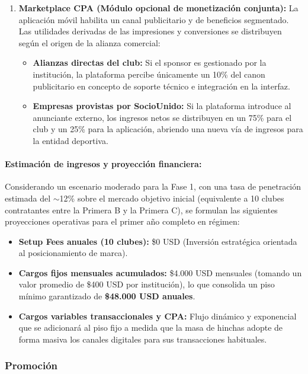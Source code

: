 \begin{enumerate}
\begin{itemize}
    \end{itemize}
    \newpage
    \item \textbf{Marketplace CPA (Módulo opcional de monetización conjunta):} La aplicación móvil habilita un canal publicitario y de beneficios segmentado. Las utilidades derivadas de las impresiones y conversiones se distribuyen según el origen de la alianza comercial:
    \begin{itemize}
        \item \textbf{Alianzas directas del club:} Si el sponsor es gestionado por la institución, la plataforma percibe únicamente un 10\% del canon publicitario en concepto de soporte técnico e integración en la interfaz.
        \item \textbf{Empresas provistas por SocioUnido:} Si la plataforma introduce al anunciante externo, los ingresos netos se distribuyen en un 75\% para el club y un 25\% para la aplicación, abriendo una nueva vía de ingresos para la entidad deportiva.
    \end{itemize}
\end{enumerate}

\paragraph{Estimación de ingresos y proyección financiera:}

Considerando un escenario moderado para la Fase 1, con una tasa de penetración estimada del $\sim$12\% sobre el mercado objetivo inicial (equivalente a 10 clubes contratantes entre la Primera B y la Primera C), se formulan las siguientes proyecciones operativas para el primer año completo en régimen:
\begin{itemize}
    \item \textbf{Setup Fees anuales (10 clubes):} \$0 USD (Inversión estratégica orientada al posicionamiento de marca).
    \item \textbf{Cargos fijos mensuales acumulados:} \$4.000 USD mensuales (tomando un valor promedio de \$400 USD por institución), lo que consolida un piso mínimo garantizado de \textbf{\$48.000 USD anuales}.
    \item \textbf{Cargos variables transaccionales y CPA:} Flujo dinámico y exponencial que se adicionará al piso fijo a medida que la masa de hinchas adopte de forma masiva los canales digitales para sus transacciones habituales.
\end{itemize}

\subsubsection*{Promoción}

